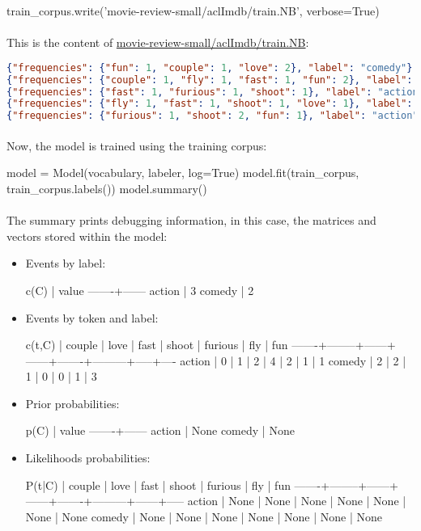 \documentclass{article}
\begin{document}
\begin{python}
train_corpus.write('movie-review-small/aclImdb/train.NB', verbose=True)
\end{python}

\paragraph{} This is the content of \url{movie-review-small/aclImdb/train.NB}:

\begin{lstlisting}[language=json,firstnumber=1]
{"frequencies": {"fun": 1, "couple": 1, "love": 2}, "label": "comedy"}
{"frequencies": {"couple": 1, "fly": 1, "fast": 1, "fun": 2}, "label": "comedy"}
{"frequencies": {"fast": 1, "furious": 1, "shoot": 1}, "label": "action"}
{"frequencies": {"fly": 1, "fast": 1, "shoot": 1, "love": 1}, "label": "action"}
{"frequencies": {"furious": 1, "shoot": 2, "fun": 1}, "label": "action"}
\end{lstlisting}

\paragraph{} Now, the model is trained using the training corpus:

\begin{python}
model = Model(vocabulary, labeler, log=True)
model.fit(train_corpus, train_corpus.labels())
model.summary()
\end{python}

\paragraph{} The summary prints debugging information, in this case, the matrices and vectors stored within the model:

\begin{itemize}
\item Events by label:
\begin{python}
c(C)   | value
-------+------
action |     3
comedy |     2
\end{python}
\item Events by token and label:
\begin{python}
c(t,C) | couple | love | fast | shoot | furious | fly | fun
-------+--------+------+------+-------+---------+-----+----
action |      0 |    1 |    2 |     4 |       2 |   1 |   1
comedy |      2 |    2 |    1 |     0 |       0 |   1 |   3
\end{python}
\item Prior probabilities:
\begin{python}
p(C)   | value
-------+------
action |  None
comedy |  None
\end{python}
\item Likelihoods probabilities:
\begin{python}
P(t|C) | couple | love | fast | shoot | furious |  fly |  fun
-------+--------+------+------+-------+---------+------+-----
action |   None | None | None |  None |    None | None | None
comedy |   None | None | None |  None |    None | None | None
\end{python}
\end{itemize}
\end{document}
